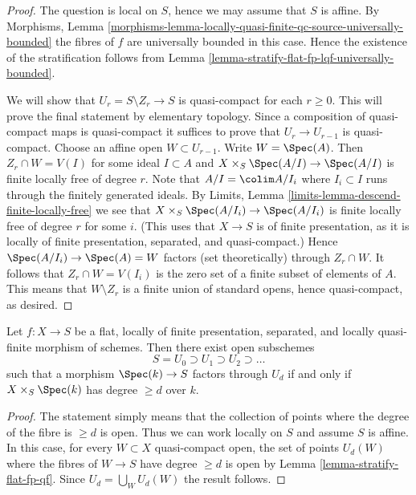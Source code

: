 \begin{proof}
The question is local on $S$, hence we may assume that $S$ is affine.
By Morphisms, Lemma
\ref{morphisms-lemma-locally-quasi-finite-qc-source-universally-bounded}
the fibres of $f$ are universally bounded in this case.
Hence the existence of the stratification follows from
Lemma \ref{lemma-stratify-flat-fp-lqf-universally-bounded}.

\medskip\noindent
We will show that $U_r = S \setminus Z_r \to S$ is quasi-compact for
each $r \geq 0$. This will prove the final statement by elementary topology.
Since a composition of quasi-compact maps is quasi-compact
it suffices to prove that $U_r \to U_{r - 1}$ is quasi-compact.
Choose an affine open $W \subset U_{r - 1}$. Write $W = \Spec(A)$.
Then $Z_r \cap W = V(I)$ for some ideal $I \subset A$
and $X \times_S \Spec(A/I) \to \Spec(A/I)$ is finite locally
free of degree $r$. Note that $A/I = \colim A/I_i$ where $I_i \subset I$
runs through the finitely generated ideals. By
Limits, Lemma \ref{limits-lemma-descend-finite-locally-free}
we see that $X \times_S \Spec(A/I_i) \to \Spec(A/I_i)$
is finite locally free of degree $r$ for some $i$. (This uses
that $X \to S$ is of finite presentation, as it is locally of finite
presentation, separated, and quasi-compact.)
Hence $\Spec(A/I_i) \to \Spec(A) = W$ factors (set theoretically)
through $Z_r \cap W$. It follows that $Z_r \cap W = V(I_i)$ is the zero
set of a finite subset of elements of $A$. This means that
$W \setminus Z_r$ is a finite union of standard opens, hence quasi-compact,
as desired.
\end{proof}

\begin{lemma}
\label{lemma-stratify-flat-fp-lqf}
Let $f : X \to S$ be a flat, locally of finite presentation, separated, and
locally quasi-finite morphism of schemes. Then there
exist open subschemes
$$
S = U_0 \supset U_1 \supset U_2 \supset \ldots
$$
such that a morphism $\Spec(k) \to S$ factors through $U_d$ if and
only if $X \times_S \Spec(k)$ has degree $\geq d$ over $k$.
\end{lemma}

\begin{proof}
The statement simply means that the collection of points where the degree
of the fibre is $\geq d$ is open. Thus we can work locally on $S$ and
assume $S$ is affine. In this case, for every $W \subset X$ quasi-compact
open, the set of points $U_d(W)$ where the fibres of $W \to S$ have
degree $\geq d$ is open by Lemma \ref{lemma-stratify-flat-fp-qf}.
Since $U_d = \bigcup_W U_d(W)$ the result follows.
\end{proof}

